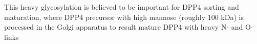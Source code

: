 This heavy glycosylation is believed to be important for DPP4 sorting and maturation, where DPP4 precursor with high mannose (roughly 100 kDa) is processed in the Golgi apparatus to result mature DPP4 with heavy N- and O-links \cite{Matter_1991}